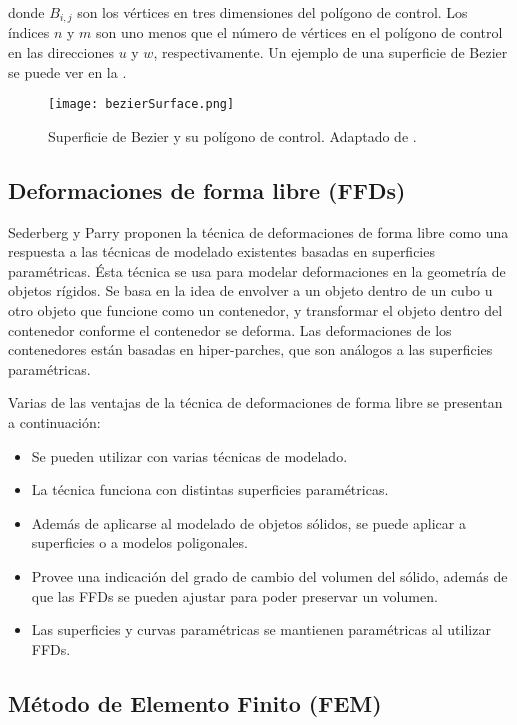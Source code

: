 donde $B_{i,j}$ son los vértices en tres dimensiones del polígono de control. Los índices $n$ y $m$ son uno menos que el número de vértices en el polígono de control en las direcciones $u$ y $w$, respectivamente. Un ejemplo de una superficie de Bezier se puede ver en la .

\begin{figure}[!ht]
	\centering
		\texttt{[image: bezierSurface.png]}
	\caption[Superficie de Bezier.]{Superficie de Bezier y su polígono de control. Adaptado de \citep{Rogers2001}.}
	\label{fig:bezierSurface}
\end{figure}

\subsection{Deformaciones de forma libre (FFDs)}

Sederberg y Parry \citep{sederberg1986free} proponen la técnica de deformaciones de forma libre como una respuesta a las técnicas de modelado existentes basadas en superficies paramétricas. Ésta técnica se usa para modelar deformaciones en la geometría de objetos rígidos. Se basa en la idea de envolver a un objeto dentro de un cubo u otro objeto que funcione como un contenedor, y transformar el objeto dentro del contenedor conforme el contenedor se deforma. Las deformaciones de los contenedores están basadas en hiper-parches, que son análogos a las superficies paramétricas. 

Varias de las ventajas de la técnica de deformaciones de forma libre se presentan a continuación:

\begin{itemize}
	\item Se pueden utilizar con varias técnicas de modelado.
	\item La técnica funciona con distintas superficies paramétricas.
	\item Además de aplicarse al modelado de objetos sólidos, se puede aplicar a superficies o a modelos poligonales.
	\item Provee una indicación del grado de cambio del volumen del sólido, además de que las FFDs se pueden ajustar para poder preservar un volumen.
	\item Las superficies y curvas paramétricas se mantienen paramétricas al utilizar FFDs. 
\end{itemize}

\subsection{Método de Elemento Finito (FEM)}

